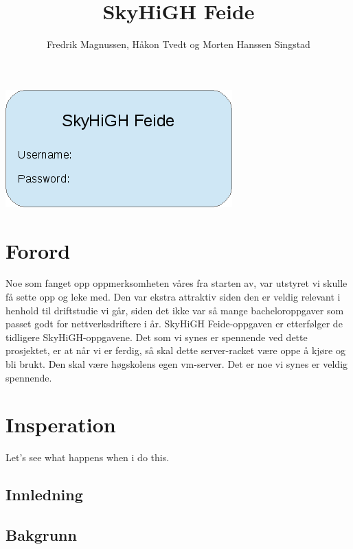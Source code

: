 \documentclass[12pt,a4paper]{article}
\begin{document}
\title{SkyHiGH Feide}
\author{Fredrik Magnussen, Håkon Tvedt og Morten Hanssen Singstad}
\maketitle 
\begin{center}
\includegraphics[scale=1]{frontpageimage.png}
\end{center}

\newpage
\tableofcontents


\newpage
\section{Forord}
Noe som fanget opp oppmerksomheten våres fra starten av, var utstyret vi skulle få sette opp og leke med. Den var ekstra attraktiv siden den er veldig relevant i henhold til driftstudie vi går, siden det ikke var så mange bacheloroppgaver som passet godt for nettverksdriftere i år. SkyHiGH Feide-oppgaven er etterfølger de tidligere SkyHiGH-oppgavene. Det som vi synes er spennende ved dette prosjektet, er at når vi er ferdig, så skal dette server-racket være oppe å kjøre og bli brukt. Den skal være høgskolens egen vm-server. Det er noe vi synes er veldig spennende.

\section{Insperation}
Let's see what happens when i do this.

\newpage
\begin{center}
\section{Innledning}
\end{center}
\subsection{Bakgrunn}
\end{document}
